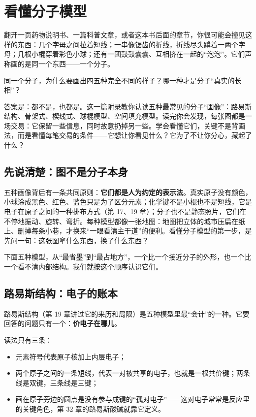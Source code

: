 \chapter{看懂分子模型}

\begin{kaichang}
翻开一页药物说明书、一篇科普文章，或者这本书后面的章节，你很可能会撞见这样的东西：几个字母之间拉着短线；一串像锯齿的折线，折线尽头蹲着一两个字母；几根小棍穿着彩色小球；还有一团鼓鼓囊囊、互相挤在一起的“泡泡”。它们声称画的是同一个东西——一个分子。

同一个分子，为什么要画出四五种完全不同的样子？哪一种才是分子“真实的长相”？

答案是：都不是，也都是。这一篇附录教你认读五种最常见的分子“画像”：路易斯结构、骨架式、楔线式、球棍模型、空间填充模型。读完你会发现，每张图都是一场交易：它保留一些信息，同时故意扔掉另一些。学会看懂它们，关键不是背画法，而是看懂每笔交易的条件——它想让你看见什么？它为了不让你分心，藏起了什么？
\end{kaichang}

\section{先说清楚：图不是分子本身}

五种画像背后有一条共同原则：\textbf{它们都是人为约定的表示法}。真实原子没有颜色，小球涂成黑色、红色、蓝色只是为了区分元素；化学键不是小棍也不是短线，它是电子在原子之间的一种排布方式（第 17、19 章）；分子也不是静态照片，它们在不停地振动、旋转、弯折。每种模型都像一张地图：地图把立体的城市压扁在纸上、删掉每条小巷，才换来“一眼看清主干道”的便利。看懂分子模型的第一步，是先问一句：这张图拿什么东西，换了什么东西？

下面五种模型，从“最省墨”到“最占地方”，一个比一个接近分子的外形，也一个比一个看不清内部结构。我们就按这个顺序认识它们。

\section{路易斯结构：电子的账本}

路易斯结构（第 19 章讲过它的来历和局限）是五种模型里最“会计”的一种。它要回答的问题只有一个：\textbf{价电子在哪儿}。

读法只有三条：

\begin{itemize}[itemsep=2pt]
\item 元素符号代表原子核加上内层电子；
\item 两个原子之间的一条短线，代表一对被共享的电子，也就是一根共价键；两条线是双键，三条线是三键；
\item 画在原子旁边的圆点是没有参与成键的“孤对电子”——这对电子常常是反应里的关键角色，第 32 章的路易斯酸碱就靠它定义。
\end{itemize}

